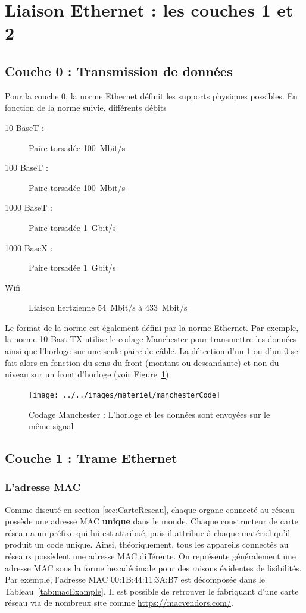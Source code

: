 \FloatBarrier
\section{Liaison Ethernet : les couches 1 et 2}
\subsection{Couche 0 : Transmission de données}
Pour la couche 0, la norme Ethernet définit les supports physiques possibles. En fonction de la norme suivie, différents débits
\begin{description}
  \item [10 BaseT : ] Paire torsadée \SI{100}{Mbit/s}
  \item [100 BaseT : ] Paire torsadée \SI{100}{Mbit/s}
  \item [1000 BaseT : ] Paire torsadée \SI{1}{Gbit/s}
  \item [1000 BaseX : ] Paire torsadée \SI{1}{Gbit/s}
  \item [Wifi] Liaison hertzienne \SI{54}{Mbit/s} à \SI{433}{Mbit/s}
\end{description}

Le format de la norme est également défini par la norme Ethernet. Par exemple, la norme 10 Bast-TX utilise le codage Manchester pour transmettre les données ainsi que l'horloge sur une seule paire de câble. La détection d'un 1 ou d'un 0 se fait alors en fonction du sens du front (montant ou descandante) et non du niveau sur un front d'horloge (voir Figure~\ref{fig:manchesterCode}).

\begin{figure}[h]
  \centering
  \texttt{[image: ../../images/materiel/manchesterCode]}
  \caption{Codage Manchester : L'horloge et les données sont envoyées sur le même signal}
  \label{fig:manchesterCode}
\end{figure}

\subsection{Couche 1 : Trame Ethernet}
\subsubsection{L'adresse MAC}
Comme discuté en section \ref{sec:CarteReseau}, chaque organe connecté au réseau possède une adresse MAC \textbf{unique} dans le monde. Chaque constructeur de carte réseau a un préfixe qui lui est attribué, puis il attribue à chaque matériel qu'il produit un code unique. Ainsi, théoriquement, tous les appareils connectés au réseaux possèdent une adresse MAC différente. On représente généralement une adresse MAC sous la forme hexadécimale pour des raisons évidentes de lisibilités. Par exemple, l'adresse MAC 00:1B:44:11:3A:B7 est décomposée dans le Tableau~\ref{tab:macExample}. Il est possible de retrouver le fabriquant d'une carte réseau via de nombreux site comme \url{https://macvendors.com/}.

